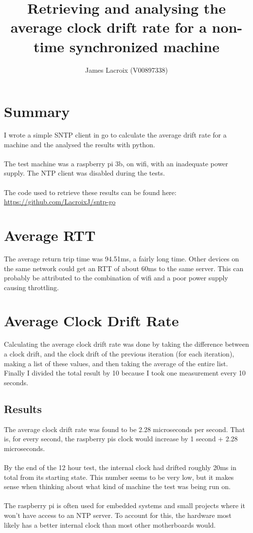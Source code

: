 \documentclass{article}
\begin{document}
\author{James Lacroix (V00897338)}
\title{Retrieving and analysing the average clock drift rate for a non-time synchronized machine}

\maketitle

\section*{Summary}
I wrote a simple SNTP client in go to calculate the average drift rate for a machine and the analysed the results with python. \\
\\
The test machine was a raspberry pi 3b, on wifi, with an inadequate power supply. The NTP client was disabled during the tests. \\
\\
The code used to retrieve these results can be found here: \\
\url{https://github.com/LacroixJ/sntp-go}



\section*{Average RTT}
The average return trip time was 94.51ms, a fairly long time. Other devices on the same network could get an RTT of about 60ms to the same server. This can probably be attributed to the combination of wifi and a poor power supply causing throttling. 



\section*{Average Clock Drift Rate}
Calculating the average clock drift rate was done by taking the difference between a clock drift, and the clock drift of the previous iteration (for each iteration), making a list of these values, and then taking the average of the entire list. Finally I divided the total result by 10 because I took one measurement every 10 seconds. 

\subsection*{Results}
The average clock drift rate was found to be 2.28 microseconds per second. That is, for every second, the raspberry pis clock would increase by 1 second + 2.28 microseconds.\\
\\
By the end of the 12 hour test, the internal clock had drifted roughly 20ms in total from its starting state. 
This number seems to be very low, but it makes sense when thinking about what kind of machine the test was being run on.\\ 
\\
The raspberry pi is often used for embedded systems and small projects where it won't have access to an NTP server. To account for this, the hardware most likely has a better internal clock than most other motherboards would. 
\end{document}
